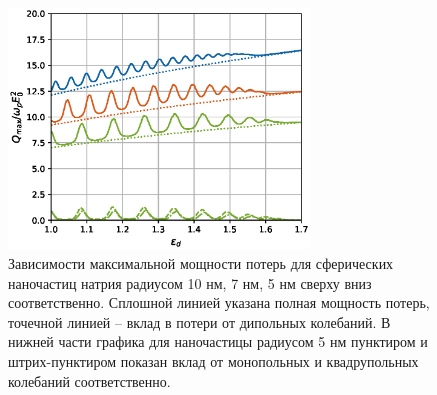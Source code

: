 \documentclass[12pt, a4paper]{article}
\begin{document}
\begin{figure}[h]
	\centering
	\includegraphics[width=80mm]{./image/natr2.eps}
	\caption{Зависимости максимальной мощности потерь для сферических наночастиц натрия радиусом 10 нм, 7 нм, 5 нм сверху вниз соответственно. Сплошной линией указана полная мощность потерь, точечной линией – вклад в потери от дипольных колебаний. В нижней части графика для наночастицы радиусом 5 нм пунктиром и штрих-пунктиром показан вклад от монопольных и квадрупольных колебаний соответственно.}
	\label{natr}
\end{figure} 
\end{document}
